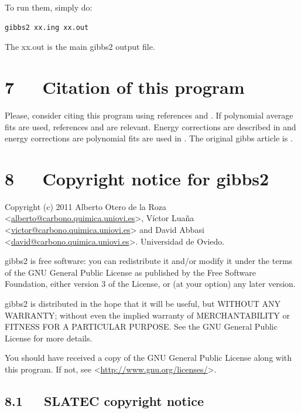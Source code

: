 \documentclass[a4paper]{article}
\begin{document}
To run them, simply do:
%
\asciilist
\begin{lstlisting}
gibbs2 xx.ing xx.out
\end{lstlisting}

The xx.out is the main gibbs2 output file.


\section{7~~~Citation of this program%
  \label{citation-of-this-program}%
}

Please, consider citing this program using references \cite{fit1} and
\cite{impl} . If polynomial average fits are used, references \cite{fit1} and
\cite{fit2} are relevant. Energy corrections are described in \cite{corr} and
energy corrections are polynomial fits are used in \cite{rig} . The
original gibbs article is \cite{orig}.


\section{8~~~Copyright notice for gibbs2%
  \label{copyright-notice-for-gibbs2}%
}

Copyright (c) 2011 Alberto Otero de la Roza <\href{mailto:alberto@carbono.quimica.uniovi.es}{alberto@carbono.quimica.uniovi.es}>,
Víctor Luaña <\href{mailto:victor@carbono.quimica.uniovi.es}{victor@carbono.quimica.uniovi.es}> and David
Abbasi <\href{mailto:david@carbono.quimica.uniovi.es}{david@carbono.quimica.uniovi.es}>. Universidad de Oviedo.

gibbs2 is free software: you can redistribute it and/or modify
it under the terms of the GNU General Public License as published by
the Free Software Foundation, either version 3 of the License, or (at
your option) any later version.

gibbs2 is distributed in the hope that it will be useful,
but WITHOUT ANY WARRANTY; without even the implied warranty of
MERCHANTABILITY or FITNESS FOR A PARTICULAR PURPOSE.  See the
GNU General Public License for more details.

You should have received a copy of the GNU General Public License
along with this program.  If not, see <\url{http://www.gnu.org/licenses/}>.


\subsection{8.1~~~SLATEC copyright notice%
  \label{slatec-copyright-notice}%
}
\end{document}
